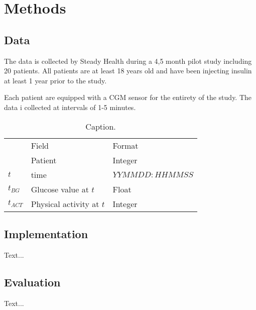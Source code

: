 \documentclass{kththesis}
\begin{document}
\chapter{Methods}

\section{Data}

The data is collected by Steady Health during a 4,5 month pilot study including 20 patients.
All patients are at least 18 years old and have been injecting insulin at least 1 year prior to the study.

Each patient are equipped with a CGM sensor for the entirety of the study.
The data i collected at intervals of 1-5 minutes.


\medskip
\begin{table}[h]
\begin{center}
  \begin{tabular}{lll}
  \textbf{
  Notation &
  Field &
  Format \\
  }
  \hline
  $P$ &
  Patient &
  Integer \\
  $t$ &
  time &
  $YYMMDD:HHMMSS$ \\
  $t_{BG}$ &
  Glucose value at $t$ &
  Float \\
  $t_{ACT}$ &
  Physical activity at $t$ &
  Integer \\
  \hline
  \end{tabular}
  \caption[]
  {\small Caption.}
  \label{table:data_description}
\end{center}
\end{table}

\section{Implementation}
Text...

\section{Evaluation}
Text...

\printbibliography

\end{document}
